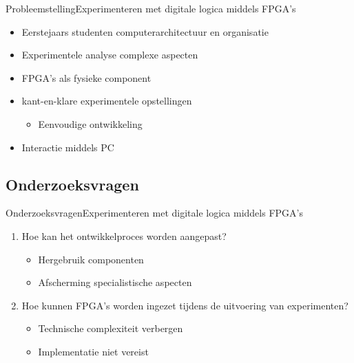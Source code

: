 \documentclass{beamer}
\begin{document}

\begin{frame}{Probleemstelling}{Experimenteren met digitale logica middels FPGA's}
  \begin{itemize}
    \item Eerstejaars studenten computerarchitectuur en organisatie
    \vspace{1em}
    \item Experimentele analyse complexe aspecten
    \vspace{1em}
    \item FPGA's als fysieke component
    \vspace{1em}
    \item kant-en-klare experimentele opstellingen
      \begin{itemize}
          \item Eenvoudige ontwikkeling
      \end{itemize}
    \vspace{0.7em}
    \item Interactie middels PC
  \end{itemize}
\end{frame}

\subsection{Onderzoeksvragen}
\begin{frame}{Onderzoeksvragen}{Experimenteren met digitale logica middels FPGA's}
\begin{enumerate}
    \item Hoe kan het ontwikkelproces worden aangepast?
        \begin{itemize}
            \item Hergebruik componenten
            \item Afscherming specialistische aspecten
        \end{itemize}
    \vspace{2em}
    \item Hoe kunnen FPGA's worden ingezet tijdens de uitvoering van experimenten?
        \begin{itemize}
            \item Technische complexiteit verbergen
            \item Implementatie niet vereist
        \end{itemize}
\end{enumerate}
\end{frame}
\end{document}
